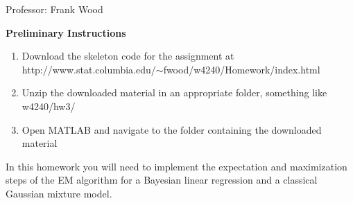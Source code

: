 \documentclass[12pt]{article}
\begin{document}

\begin{center}
	Professor: Frank Wood
\end{center}


{\bf Preliminary Instructions}

\begin{enumerate}
	\item Download the skeleton code for the assignment at \\  http://www.stat.columbia.edu/$\sim$fwood/w4240/Homework/index.html
	\item Unzip the downloaded material in an appropriate folder, something like w4240/hw3/
	\item Open MATLAB and navigate to the folder containing the downloaded material
\end{enumerate}

In this homework you will need to implement the expectation and maximization steps of the EM algorithm for a Bayesian linear regression and a classical Gaussian mixture model.\\
\end{document}
